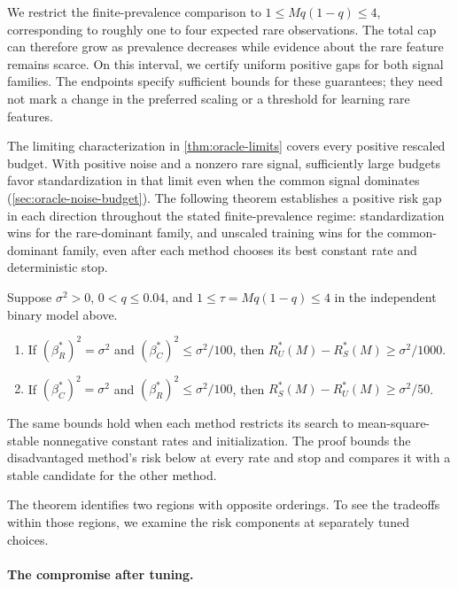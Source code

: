 \documentclass{alt2027}
\begin{document}
We restrict the finite-prevalence comparison to $1 \leq Mq(1 - q) \leq 4$,
corresponding to roughly one to four expected rare observations. The total cap
can therefore grow as prevalence decreases while evidence about the rare feature
remains scarce. On this interval, we certify uniform positive gaps for both
signal families. The endpoints specify sufficient bounds for these guarantees;
they need not mark a change in the preferred scaling or a threshold for learning
rare features.

The limiting characterization in \cref{thm:oracle-limits} covers every positive
rescaled budget. With positive noise and a nonzero rare signal, sufficiently
large budgets favor standardization in that limit even when the common signal
dominates (\cref{sec:oracle-noise-budget}). The following theorem establishes a
positive risk gap in each direction throughout the stated finite-prevalence
regime: standardization wins for the rare-dominant family, and unscaled training
wins for the common-dominant family, even after each method chooses its best
constant rate and deterministic stop.

\begin{theorem}
  \label{thm:conference-predictive}
  Suppose $\sigma^2 > 0$, $0 < q \leq 0.04$, and
  $1 \leq \tau = Mq(1 - q) \leq 4$ in the independent binary model above.
  \begin{enumerate}
    \item If $(\beta_R^*)^2 = \sigma^2$ and $(\beta_C^*)^2 \leq \sigma^2/100$,
          then $R_U^*(M) - R_S^*(M) \geq \sigma^2/1000$.
    \item If $(\beta_C^*)^2 = \sigma^2$ and $(\beta_R^*)^2 \leq \sigma^2/100$,
          then $R_S^*(M) - R_U^*(M) \geq \sigma^2/50$.
  \end{enumerate}
\end{theorem}

The same bounds hold when each method restricts its search to mean-square-stable
nonnegative constant rates and initialization. The proof bounds the
disadvantaged method's risk below at every rate and stop and compares it with a
stable candidate for the other method.

The theorem identifies two regions with opposite orderings. To see the tradeoffs
within those regions, we examine the risk components at separately tuned
choices.

\paragraph{The compromise after tuning.}
\end{document}
